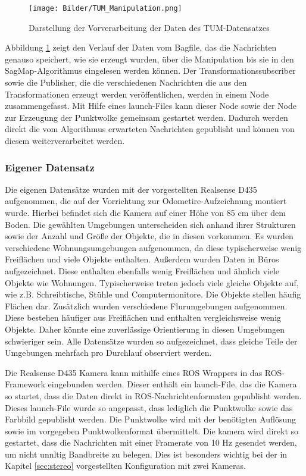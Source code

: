 \begin{figure}
	\centering
	\texttt{[image: Bilder/TUM\_Manipulation.png]}
	\caption{Darstellung der Vorverarbeitung der Daten des TUM-Datensatzes} 
	\label{fig:tum_manipulation}
\end{figure}

Abbildung \ref{fig:tum_manipulation} zeigt den Verlauf der Daten vom Bagfile, das die Nachrichten genauso speichert, wie sie erzeugt wurden, über die Manipulation bis sie in den SagMap-Algorithmus eingelesen werden können. Der Transformationssubscriber sowie die Publisher, die die verschiedenen Nachrichten die aus den Transformationen erzeugt werden veröffentlichen, werden in einem Node zusammengefasst. Mit Hilfe eines launch-Files kann dieser Node sowie der Node zur Erzeugung der Punktwolke gemeinsam gestartet werden. Dadurch werden direkt die vom Algorithmus erwarteten Nachrichten gepublisht und können von diesem weiterverarbeitet werden.  

\subsubsection{Eigener Datensatz}

Die eigenen Datensätze wurden mit der vorgestellten Realsense D435 aufgenommen, die auf der Vorrichtung zur Odometire-Aufzeichnung montiert wurde. Hierbei befindet sich die Kamera auf einer Höhe von 85 cm über dem Boden. Die gewählten Umgebungen unterscheiden sich anhand ihrer Strukturen sowie der Anzahl und Größe der Objekte, die in diesen vorkommen. Es wurden verschiedene Wohnungsumgebungen aufgenommen, da diese  typischerweise wenig Freiflächen und viele Objekte enthalten. Außerdem wurden Daten in Büros aufgezeichnet. Diese enthalten ebenfalls wenig Freiflächen und ähnlich viele Objekte wie Wohnungen. Typischerweise treten jedoch viele gleiche Objekte auf, wie z.B. Schreibtische, Stühle und Computermonitore. Die Objekte stellen häufig Flächen dar. Zusätzlich wurden verschiedene Flurumgebungen aufgenommen.  Diese bestehen häufiger aus Freiflächen und enthalten vergleichsweise wenig Objekte. Daher könnte eine  zuverlässige Orientierung in diesen Umgebungen schwieriger sein. Alle Datensätze wurden so aufgezeichnet, dass gleiche Teile der Umgebungen mehrfach pro Durchlauf observiert werden. 

Die Realsense D435 Kamera kann mithilfe eines ROS Wrappers in das ROS-Framework eingebunden werden. Dieser enthält ein launch-File, das die Kamera so startet, dass die Daten direkt in ROS-Nachrichtenformaten gepublisht werden. Dieses launch-File wurde so angepasst, dass lediglich die Punktwolke sowie das Farbbild gepublisht werden. Die Punktwolke wird mit der benötigten Auflösung sowie im vorgegeben Punktwolkenformat übermittelt. Die kamera wird direkt so gestartet, dass die Nachrichten mit einer Framerate von 10 Hz gesendet werden, um nicht unnltig Bandbreite zu belegen. Dies ist besonders wichtig bei der in Kapitel \ref{sec:stereo} vorgestellten Konfiguration mit zwei Kameras. 

